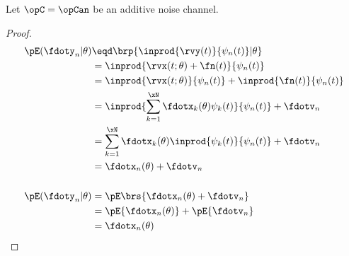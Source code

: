 \begin{theorem}%
\label{thm:an_stats}
Let $\opC=\opCan$ be an additive noise channel.
\end{theorem}
\begin{proof}
\begin{align*}
   \pE(\fdoty_n |\theta)
     &\eqd \brp{\inprod{\rvy(t)}{\psi_n(t)}  |\theta}
   \\&=    {\inprod{\rvx(t;\theta)+\fn(t)}{\psi_n(t)}}
   \\&=    {\inprod{\rvx(t;\theta)}{\psi_n(t)}} +   {\inprod{\fn(t)}{\psi_n(t)}}
   \\&=    \inprod{\sum_{k=1}^\xN \fdotx_k(\theta) \psi_k(t)}{\psi_n(t)} + \fdotv_n
   \\&=    \sum_{k=1}^\xN \fdotx_k(\theta) \inprod{\psi_k(t)}{\psi_n(t)} + \fdotv_n
   \\&=    \fdotx_n(\theta)  + \fdotv_n
\\ \\
   \pE({\fdoty_n} | \theta)
     &= \pE\brs{\fdotx_n(\theta)  + \fdotv_n}
   \\&= \pE{\fdotx_n(\theta) } +   \pE{\fdotv_n}
   \\&= \fdotx_n(\theta)
\end{align*}
\end{proof}


